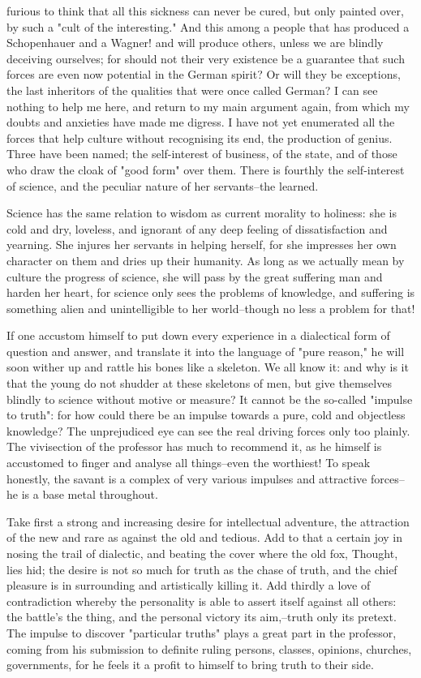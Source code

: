 furious to think that all this sickness can never be cured, but only
painted over, by such a "cult of the interesting." And this among a
people that has produced a Schopenhauer and a Wagner! and will
produce others, unless we are blindly deceiving ourselves; for should
not their very existence be a guarantee that such forces are even now
potential in the German spirit? Or will they be exceptions, the last
inheritors of the qualities that were once called German? I can see
nothing to help me here, and return to my main argument again, from
which my doubts and anxieties have made me digress. I have not yet
enumerated all the forces that help culture without recognising its
end, the production of genius. Three have been named; the
self-interest of business, of the state, and of those who draw the
cloak of "good form" over them. There is fourthly the self-interest
of science, and the peculiar nature of her servants--the learned.

Science has the same relation to wisdom as current morality to
holiness: she is cold and dry, loveless, and ignorant of any deep
feeling of dissatisfaction and yearning. She injures her servants in
helping herself, for she impresses her own character on them and
dries up their humanity. As long as we actually mean by culture the
progress of science, she will pass by the great suffering man and
harden her heart, for science only sees the problems of knowledge,
and suffering is something alien and unintelligible to her
world--though no less a problem for that!

If one accustom himself to put down every experience in a dialectical
form of question and answer, and translate it into the language of
"pure reason," he will soon wither up and rattle his bones like a
skeleton. We all know it: and why is it that the young do not shudder
at these skeletons of men, but give themselves blindly to science
without motive or measure? It cannot be the so-called "impulse to
truth": for how could there be an impulse towards a pure, cold and
objectless knowledge? The unprejudiced eye can see the real driving
forces only too plainly. The vivisection of the professor has much to
recommend it, as he himself is accustomed to finger and analyse all
things--even the worthiest! To speak honestly, the savant is a
complex of very various impulses and attractive forces--he is a base
metal throughout.

Take first a strong and increasing desire for intellectual adventure,
the attraction of the new and rare as against the old and tedious.
Add to that a certain joy in nosing the trail of dialectic, and
beating the cover where the old fox, Thought, lies hid; the desire is
not so much for truth as the chase of truth, and the chief pleasure
is in surrounding and artistically killing it. Add thirdly a love of
contradiction whereby the personality is able to assert itself
against all others: the battle's the thing, and the personal victory
its aim,--truth only its pretext. The impulse to discover "particular
truths" plays a great part in the professor, coming from his
submission to definite ruling persons, classes, opinions, churches,
governments, for he feels it a profit to himself to bring truth to
their side.

